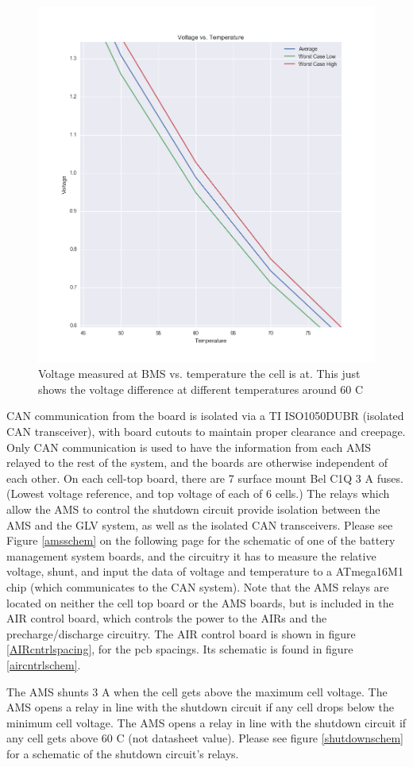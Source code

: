 \documentclass{article}
\begin{document}
        \begin{figure}[H]
        \centering
        \includegraphics[width =0.6 \textwidth]{VoltageVSTempZOOM.png}
        \caption{Voltage measured at BMS vs. temperature the cell is at. This just shows the voltage difference at different temperatures around 60 \degree C}
        \label{fig:voltageCellvsTempZOOM}
        \end{figure}

    CAN communication from the board is isolated via a TI ISO1050DUBR (isolated CAN transceiver), with board cutouts to maintain proper clearance and creepage. Only CAN communication is used to have the information from each AMS relayed to the rest of the system, and the boards are otherwise independent of each other. On each cell-top board, there are 7 surface mount Bel C1Q 3 A fuses. (Lowest voltage reference, and top voltage of each of 6 cells.) The relays which allow the AMS to control the shutdown circuit provide isolation between the AMS and the GLV system, as well as the isolated CAN transceivers. Please see Figure \ref{amsschem} on the following page for the schematic of one of the battery management system boards, and the circuitry it has to measure the relative voltage, shunt, and input the data of voltage and temperature to a ATmega16M1 chip (which communicates to the CAN system). Note that the AMS relays are located on neither the cell top board or the AMS boards, but is included in the AIR control board, which controls the power to the AIRs and the precharge/discharge circuitry. The AIR control board is shown in figure \ref{AIRcntrlspacing}, for the pcb spacings. Its schematic is found in figure \ref{aircntrlschem}.

    The AMS shunts 3 A when the cell gets above the maximum cell voltage. The AMS opens a relay in line with the shutdown circuit if any cell drops below the minimum cell voltage. The AMS opens a relay in line with the shutdown circuit if any cell gets above 60 \degree C (not datasheet value). Please see figure \ref{shutdownschem} for a schematic of the shutdown circuit's relays.
\end{document}
